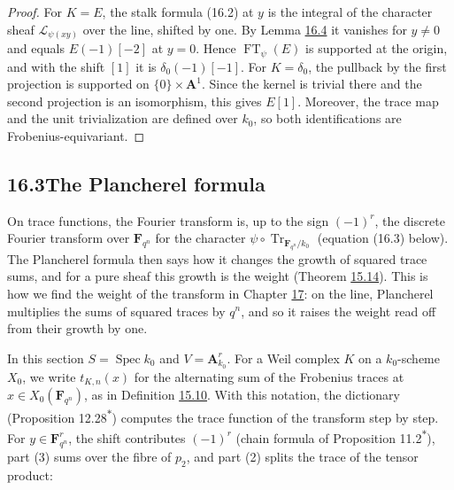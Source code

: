 \documentclass[11pt]{article}
\newcommand{\bpout}[1]{#1\textsuperscript{\hyperlink{bp-outside}{\ensuremath{\ast}}}}
\begin{document}
\begin{proof}[{Proof}]\label{bp189}%
For \(K=E\), the stalk formula (16.2) at \(y\) is the integral of the character sheaf \(\mathcal L_{\psi(xy)}\) over the line, shifted by one. By Lemma \hyperref[bp179]{16.4} it vanishes for \(y\ne0\) and equals \(E(-1)[-2]\) at \(y=0\). Hence \(\operatorname{FT}_\psi(E)\) is supported at the origin, and with the shift \([1]\) it is \(\delta_0(-1)[-1]\). For \(K=\delta_0\), the pullback by the first projection is supported on \(\{0\}\times\mathbf A^1\). Since the kernel is trivial there and the second projection is an isomorphism, this gives \(E[1]\). Moreover, the trace map and the unit trivialization are defined over \(k_0\), so both identifications are Frobenius-equivariant.
\end{proof}


\subsection*{\texorpdfstring{16.3\quad The Plancherel formula}{16.3 The Plancherel formula}}
\label{bp190}%
\label{bp191}%
On trace functions, the Fourier transform is, up to the sign \((-1)^r\), the discrete Fourier transform over \(\mathbf F_{q^n}\) for the character \(\psi\circ\operatorname{Tr}_{\mathbf F_{q^n}/k_0}\) (equation (16.3) below). The Plancherel formula then says how it changes the growth of squared trace sums, and for a pure sheaf this growth is the weight (Theorem \hyperref[bp162]{15.14}). This is how we find the weight of the transform in Chapter \hyperref[bp223]{17}: on the line, Plancherel multiplies the sums of squared traces by \(q^n\), and so it raises the weight read off from their growth by one.

In this section \(S=\operatorname{Spec}k_0\) and \(V=\mathbf A^r_{k_0}\). For a Weil complex \(K\) on a \(k_0\)-scheme \(X_0\), we write \(t_{K,n}(x)\) for the alternating sum of the Frobenius traces at \(x\in X_0(\mathbf F_{q^n})\), as in Definition \hyperref[bp151]{15.10}. With this notation, the dictionary (Proposition \bpout{12.28}) computes the trace function of the transform step by step. For \(y\in\mathbf F_{q^n}^r\), the shift contributes \((-1)^r\) (chain formula of Proposition \bpout{11.2}), part (3) sums over the fibre of \(p_2\), and part (2) splits the trace of the tensor product:
\end{document}
